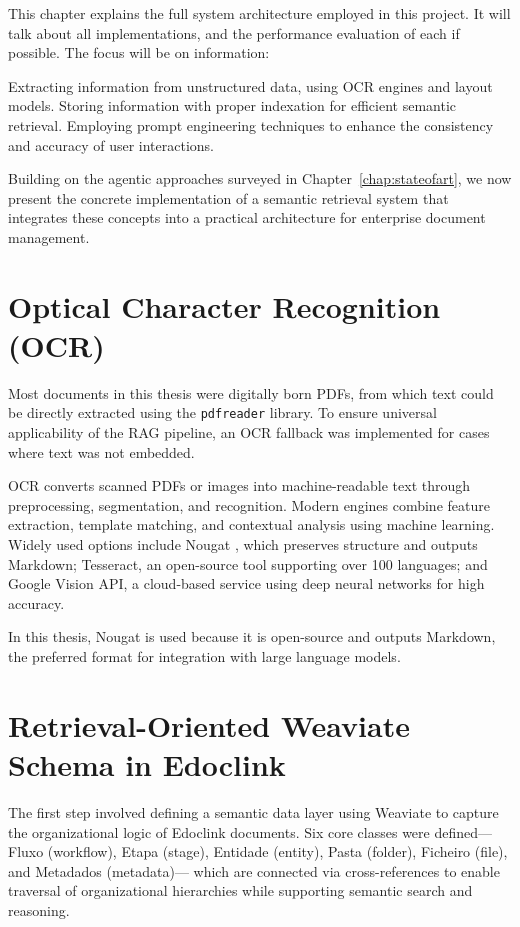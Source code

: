 \label{chap:systemarch}
This chapter explains the full system architecture employed in this project. It will talk about all implementations, and the performance evaluation of each if possible. The focus will be on information:

Extracting information from unstructured data, using OCR engines and layout models.
Storing information with proper indexation for efficient semantic retrieval.
Employing prompt engineering techniques to enhance the consistency and accuracy of user interactions.

Building on the agentic approaches surveyed in Chapter~\ref{chap:stateofart}, we now present the concrete implementation of a semantic retrieval system that integrates these concepts into a practical architecture for enterprise document management.

\section{Optical Character Recognition (OCR)}\label{sec:ocr}
Most documents in this thesis were digitally born PDFs, from which text could be directly extracted using the \texttt{pdfreader} library. To ensure universal applicability of the \gls{RAG} pipeline, an \gls{OCR} fallback was implemented for cases where text was not embedded. 

OCR converts scanned PDFs or images into machine-readable text through preprocessing, segmentation, and recognition. Modern engines combine feature extraction, template matching, and contextual analysis using machine learning. Widely used options include Nougat \cite{blecher2023nougatneuralopticalunderstanding}, which preserves structure and outputs Markdown; Tesseract, an open-source tool supporting over 100 languages; and Google Vision API, a cloud-based service using deep neural networks for high accuracy.

In this thesis, Nougat is used because it is open-source and outputs Markdown, the preferred format for integration with large language models.

\section{Retrieval-Oriented Weaviate Schema in Edoclink}\label{sec:schema}

The first step involved defining a semantic data layer using Weaviate to capture the organizational logic of Edoclink documents. Six core classes were defined—Fluxo (workflow), Etapa (stage), Entidade (entity), Pasta (folder), Ficheiro (file), and Metadados (metadata)— which are connected via cross-references to enable traversal of organizational hierarchies while supporting semantic search and reasoning.

